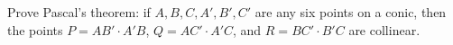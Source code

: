 Prove Pascal's theorem: if $A, B, C, A', B', C'$ are any six points on a conic, then the points $P = AB' \cdot A'B$, $Q = AC' \cdot A'C$, and $R = BC' \cdot B'C$ are collinear.
